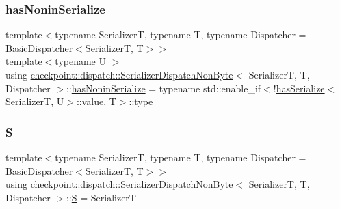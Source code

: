 \mbox{\label{structcheckpoint_1_1dispatch_1_1_serializer_dispatch_non_byte_ad59e5c933a762ce90d1ab5f7ca04ca9f}} 
\subsubsection{\texorpdfstring{has\+Nonin\+Serialize}{hasNoninSerialize}}
{\footnotesize\ttfamily template$<$typename SerializerT, typename T, typename Dispatcher = Basic\+Dispatcher$<$\+Serializer\+T, T$>$$>$ \\
template$<$typename U $>$ \\
using \hyperlink{structcheckpoint_1_1dispatch_1_1_serializer_dispatch_non_byte}{checkpoint\+::dispatch\+::\+Serializer\+Dispatch\+Non\+Byte}$<$ SerializerT, T, Dispatcher $>$\+::\hyperlink{structcheckpoint_1_1dispatch_1_1_serializer_dispatch_non_byte_ad59e5c933a762ce90d1ab5f7ca04ca9f}{has\+Nonin\+Serialize} =  typename std\+::enable\+\_\+if$<$!\hyperlink{structcheckpoint_1_1dispatch_1_1has_serialize}{has\+Serialize}$<$SerializerT, U$>$\+::value, T$>$\+::type}

\mbox{\label{structcheckpoint_1_1dispatch_1_1_serializer_dispatch_non_byte_a456d0c02fc35667989d79ddbb0393776}} 
\subsubsection{\texorpdfstring{S}{S}}
{\footnotesize\ttfamily template$<$typename SerializerT, typename T, typename Dispatcher = Basic\+Dispatcher$<$\+Serializer\+T, T$>$$>$ \\
using \hyperlink{structcheckpoint_1_1dispatch_1_1_serializer_dispatch_non_byte}{checkpoint\+::dispatch\+::\+Serializer\+Dispatch\+Non\+Byte}$<$ SerializerT, T, Dispatcher $>$\+::\hyperlink{structcheckpoint_1_1dispatch_1_1_serializer_dispatch_non_byte_a456d0c02fc35667989d79ddbb0393776}{S} =  SerializerT}



